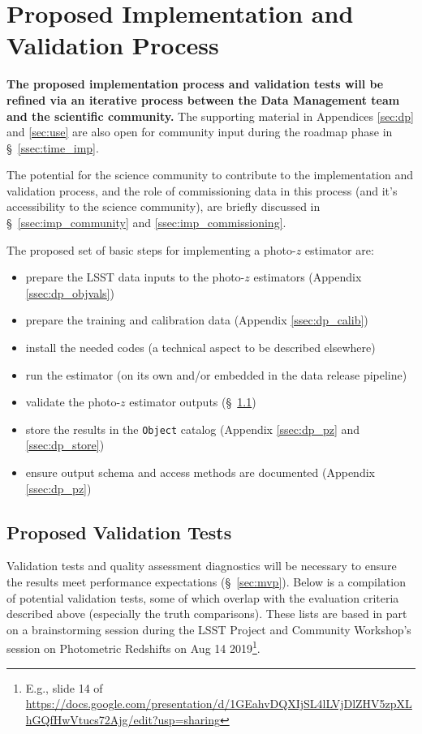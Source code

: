 \documentclass[DM,lsstdraft,toc]{lsstdoc}
\begin{document}
\clearpage
\section{Proposed Implementation and Validation Process}\label{sec:imp}

\textbf{The proposed implementation process and validation tests will be refined via an iterative process between the Data Management team and the scientific community.}
The supporting material in Appendices \ref{sec:dp} and \ref{sec:use} are also open for community input during the roadmap phase in \S~\ref{ssec:time_imp}.

The potential for the science community to contribute to the implementation and validation process, and the role of commissioning data in this process (and it's accessibility to the science community), are briefly discussed in \S~\ref{ssec:imp_community} and \ref{ssec:imp_commissioning}.

The proposed set of basic steps for implementing a photo-$z$ estimator are:
\vspace{-15pt}
\begin{itemize}
\item prepare the LSST data inputs to the photo-$z$ estimators (Appendix \ref{ssec:dp_objvals})
\item prepare the training and calibration data (Appendix \ref{ssec:dp_calib})
\item install the needed codes (a technical aspect to be described elsewhere)
\item run the estimator (on its own and/or embedded in the data release pipeline)
\item validate the photo-$z$ estimator outputs (\S~\ref{ssec:imp_val})
\item store the results in the {\tt Object} catalog (Appendix \ref{ssec:dp_pz} and \ref{ssec:dp_store})
\item ensure output schema and access methods are documented (Appendix \ref{ssec:dp_pz})
\end{itemize}

\subsection{Proposed Validation Tests}\label{ssec:imp_val}

Validation tests and quality assessment diagnostics will be necessary to ensure the results meet performance expectations (\S~\ref{sec:mvp}).
Below is a compilation of potential validation tests, some of which overlap with the evaluation criteria described above (especially the truth comparisons). 
These lists are based in part on a brainstorming session during the LSST Project and Community Workshop's session on Photometric Redshifts on Aug 14 2019\footnote{E.g., slide 14 of \url{https://docs.google.com/presentation/d/1GEahvDQXIjSL4lLVjDlZHV5zpXLhGQfHwVtucs72Ajg/edit?usp=sharing}}.
\end{document}
